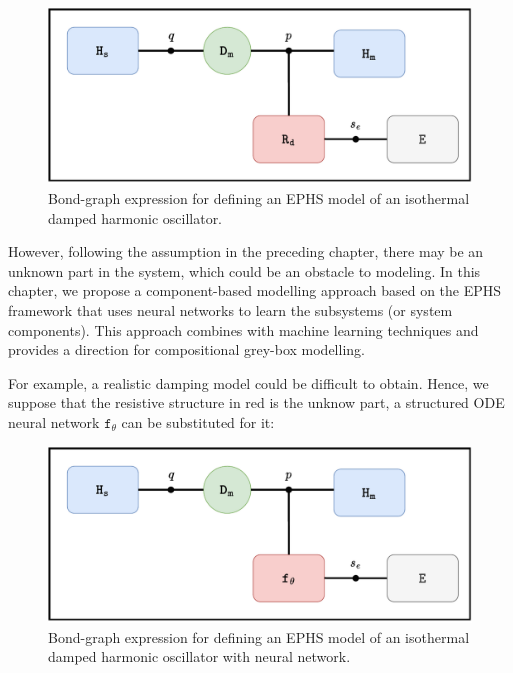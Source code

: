 \documentclass[
	parskip, 			   %
	twoside, 			   %
	DIV=14, 			   %
	BCOR=15.0mm, 		   %
	headsepline, 		   %
	open=right, 		   %
	captions=tableheading, %
	bibliography=totoc,    %
	numbers=noenddot       %
]{scrreprt}
\begin{document}
\begin{figure}[h!]
    \centering
    \includegraphics[scale=0.6]{figures/bondgraph_idho_exergetic.pdf}
    \caption{Bond-graph expression for defining an EPHS model of an isothermal damped harmonic oscillator.}
    \label{fig:bondgraph_idho_exergetic}
\end{figure}

However, following the assumption in the preceding chapter, there may be an unknown part in the system, which could be an obstacle to modeling. In this chapter, we propose a component-based modelling approach based on the EPHS framework that uses neural networks to learn the subsystems (or system components). This approach combines with machine learning techniques and provides a direction for compositional grey-box modelling.

For example, a realistic damping model could be difficult to obtain. Hence, we suppose that the resistive structure in red is the unknow part, a structured ODE neural network $\mathtt{f_{\theta}}$ can be substituted for it:

\clearpage
\begin{figure}[h!]
    \centering
    \includegraphics[scale=0.6]{figures/bondgraph_idho_exergetic_NN.pdf}
    \caption{Bond-graph expression for defining an EPHS model of an isothermal damped harmonic oscillator with neural network.}
    \label{fig:bondgraph_idho_exergetic_NN}
\end{figure}
\end{document}
